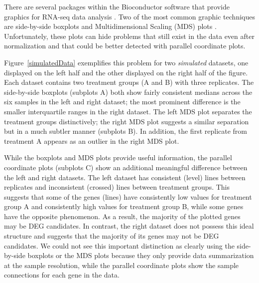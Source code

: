 \documentclass{bmcart}
\begin{document}
\begin{linenumbers}
\begin{doublespacing}
There are several packages within the Bioconductor software \cite{bioconductor} that provide graphics for RNA-seq data analysis \cite{Huber}. Two of the most common graphic techniques are side-by-side boxplots and Multidimensional Scaling (MDS) plots \cite{Love, Risso, Robinson, Ritchie}. Unfortunately, these plots can hide problems that still exist in the data even after normalization and that could be better detected with parallel coordinate plots.

Figure~\ref{simulatedData} exemplifies this problem for two \textit{simulated} datasets, one displayed on the left half and the other displayed on the right half of the figure. Each dataset contains two treatment groups (A and B) with three replicates. The side-by-side boxplots (subplots A) both show fairly consistent medians across the six samples in the left and right dataset; the most prominent difference is the smaller interquartile ranges in the right dataset. The left MDS plot separates the treatment groups distinctively; the right MDS plot suggests a similar separation but in a much subtler manner (subplots B). In addition, the first replicate from treatment A appears as an outlier in the right MDS plot.

While the boxplots and MDS plots provide useful information, the parallel coordinate plots (subplots C) show an additional meaningful difference between the left and right datasets. The left dataset has consistent (level) lines between replicates and inconsistent (crossed) lines between treatment groups. This suggests that some of the genes (lines) have consistently low values for treatment group A and consistently high values for treatment group B, while some genes have the opposite phenomenon. As a result, the majority of the plotted genes may be DEG candidates. In contrast, the right dataset does not possess this ideal structure and suggests that the majority of its genes may not be DEG candidates. We could not see this important distinction as clearly using the side-by-side boxplots or the MDS plots because they only provide data summarization at the sample resolution, while the parallel coordinate plots show the sample connections for each gene in the data.


\end{doublespacing}
\end{linenumbers}
\end{document}
